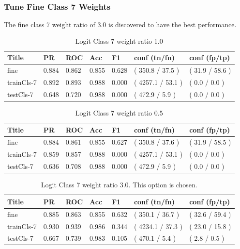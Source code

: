 \documentclass[ms]{nuthesis}
\begin{document}
\subsubsection{Tune Fine Class 7 Weights}
\par The fine class 7 weight ratio of 3.0 is discovered to have the best performance.
\FloatBarrier
\begin{table}[H]
\centering
\caption{Logit Class 7 weight ratio 1.0}
\label{tab:LogRegCls7-Wt1}
\begin{tabular}{|l||l||l||l||l||l||l|}\toprule
Title & PR & ROC & Acc & F1 & conf (tn/fn) & conf (fp/tp) \\ \midrule
fine & 0.884 & 0.862 & 0.855 & 0.628 & ( 350.8 / 37.5 ) & ( 31.9 / 58.6 ) \\
trainCls-7 & 0.892 & 0.893 & 0.988 & 0.000 & ( 4257.1 / 53.1 ) & ( 0.0 / 0.0 ) \\
testCls-7 & 0.648 & 0.720 & 0.988 & 0.000 & ( 472.9 / 5.9 ) & ( 0.0 / 0.0 ) \\ \bottomrule
\end{tabular}
\end{table}
\FloatBarrier

\FloatBarrier
\begin{table}[H]
\centering
\caption{Logit Class 7 weight ratio 0.5}
\label{tab:LogRegCls7-Wtp5}
\begin{tabular}{|l||l||l||l||l||l||l|}\toprule
Title & PR & ROC & Acc & F1 & conf (tn/fn) & conf (fp/tp) \\ \midrule
fine & 0.884 & 0.861 & 0.855 & 0.627 & ( 350.8 / 37.6 ) & ( 31.9 / 58.5 ) \\
trainCls-7 & 0.859 & 0.857 & 0.988 & 0.000 & ( 4257.1 / 53.1 ) & ( 0.0 / 0.0 ) \\
testCls-7 & 0.636 & 0.708 & 0.988 & 0.000 & ( 472.9 / 5.9 ) & ( 0.0 / 0.0 ) \\ \bottomrule
\end{tabular}
\end{table}
\FloatBarrier



\FloatBarrier
\begin{table}[H]
\centering
\caption{Logit Class 7 weight ratio 3.0. This option is chosen.}
\label{tab:LogRegCls7-Wt3}
\begin{tabular}{|l||l||l||l||l||l||l|}\toprule
Title & PR & ROC & Acc & F1 & conf (tn/fn) & conf (fp/tp) \\ \midrule
fine & 0.885 & 0.863 & 0.855 & 0.632 & ( 350.1 / 36.7 ) & ( 32.6 / 59.4 ) \\
trainCls-7 & 0.930 & 0.939 & 0.986 & 0.344 & ( 4234.1 / 37.3 ) & ( 23.0 / 15.8 ) \\
testCls-7 & 0.667 & 0.739 & 0.983 & 0.105 & ( 470.1 / 5.4 ) & ( 2.8 / 0.5 ) \\ \bottomrule
\end{tabular}
\end{table}
\FloatBarrier
\end{document}

